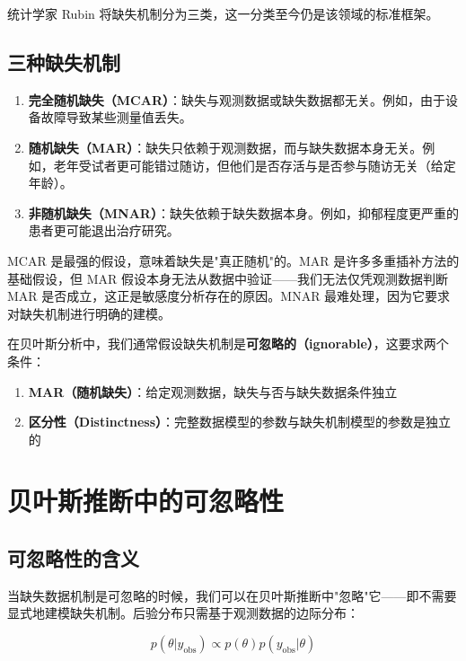 统计学家 Rubin \cite{Rubin1976} 将缺失机制分为三类，这一分类至今仍是该领域的标准框架。

\subsection{三种缺失机制}

\begin{enumerate}
  \item \textbf{完全随机缺失（MCAR）}：缺失与观测数据或缺失数据都无关。例如，由于设备故障导致某些测量值丢失。
  \item \textbf{随机缺失（MAR）}：缺失只依赖于观测数据，而与缺失数据本身无关。例如，老年受试者更可能错过随访，但他们是否存活与是否参与随访无关（给定年龄）。
  \item \textbf{非随机缺失（MNAR）}：缺失依赖于缺失数据本身。例如，抑郁程度更严重的患者更可能退出治疗研究。
\end{enumerate}

\begin{Remark}
  MCAR 是最强的假设，意味着缺失是"真正随机"的。MAR 是许多多重插补方法的基础假设，但 MAR 假设本身无法从数据中验证——我们无法仅凭观测数据判断 MAR 是否成立，这正是敏感度分析存在的原因。MNAR 最难处理，因为它要求对缺失机制进行明确的建模。
\end{Remark}
\label{rem:mar-verifiability}

在贝叶斯分析中，我们通常假设缺失机制是\textbf{可忽略的（ignorable）}，这要求两个条件：
\begin{enumerate}
  \item \textbf{MAR（随机缺失）}：给定观测数据，缺失与否与缺失数据条件独立
  \item \textbf{区分性（Distinctness）}：完整数据模型的参数与缺失机制模型的参数是独立的
\end{enumerate}

\section{贝叶斯推断中的可忽略性}
\label{sec:ignorability}

\subsection{可忽略性的含义}

当缺失数据机制是可忽略的时候，我们可以在贝叶斯推断中"忽略"它——即不需要显式地建模缺失机制。后验分布只需基于观测数据的边际分布：

\[
p(\theta | y_{\text{obs}}) \propto p(\theta) p(y_{\text{obs}} | \theta)
\label{eq:ignorability-posterior}
\]

